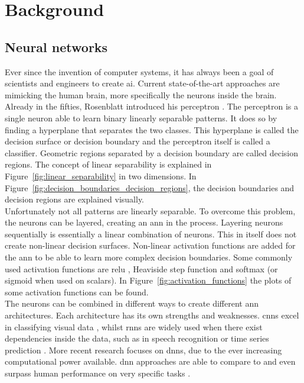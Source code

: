 \chapter{Background}\label{chap:background}
\section{Neural networks}
Ever since the invention of computer systems, it has always been a goal of scientists and engineers to create \gls{ai}. Current state-of-the-art approaches are mimicking the human brain, more specifically the neurons inside the brain. Already in the fifties, Rosenblatt introduced his perceptron \cite{rosenblatt_perceptron_1958}. The perceptron is a single neuron able to learn binary linearly separable patterns. It does so by finding a hyperplane that separates the two classes. This hyperplane is called the decision surface or decision boundary and the perceptron itself is called a classifier. Geometric regions separated by a decision boundary are called decision regions. The concept of linear separability is explained in Figure~\ref{fig:linear_separability} in two dimensions. In Figure~\ref{fig:decision_boundaries_decision_regions}, the decision boundaries and decision regions are explained visually. \\

Unfortunately not all patterns are linearly separable. To overcome this problem, the neurons can be layered, creating an \gls{ann} in the process. Layering neurons sequentially is essentially a linear combination of neurons. This in itself does not create non-linear decision surfaces. Non-linear activation functions are added for the \gls{ann} to be able to learn more complex decision boundaries. Some commonly used activation functions are \gls{relu} \cite{relu}, Heaviside step function \cite{heaviside} and softmax \cite{softmax} (or sigmoid when used on scalars). In Figure~\ref{fig:activation_functions} the plots of some activation functions can be found.\\ 

The neurons can be combined in different ways to create different \gls{ann} architectures. Each architecture has its own strengths and weaknesses. \glspl{cnn} excel in classifying visual data \cite{face_recognition_survey, cnn_1, cnn_2}, whilst \glspl{rnn} are widely used when there exist dependencies inside the data, such as in speech recognition \cite{speech_1, speech_2} or time series prediction \cite{time_series_1}. More recent research focuses on \glspl{dnn}, due to the ever increasing computational power available. \gls{dnn} approaches are able to compare to and even surpass human performance on very specific tasks \cite{alpha_go_google, imagenet_dnn}.\\ 

